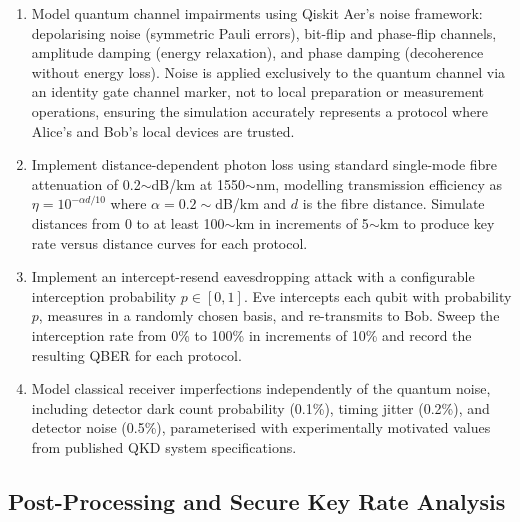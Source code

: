 \documentclass[10pt, a4paper]{report}
\begin{document}
\begin{enumerate}[label=\textbf{O3.\arabic*}, leftmargin=1.5cm]
    \item Model quantum channel impairments using Qiskit Aer's noise framework: depolarising noise (symmetric Pauli errors), bit-flip and phase-flip channels, amplitude damping (energy relaxation), and phase damping (decoherence without energy loss). Noise is applied exclusively to the quantum channel via an identity gate channel marker, not to local preparation or measurement operations, ensuring the simulation accurately represents a protocol where Alice's and Bob's local devices are trusted.

    \item Implement distance-dependent photon loss using standard single-mode fibre attenuation of 0.2$\sim$dB/km at 1550$\sim$nm, modelling transmission efficiency as $\eta = 10^{-\alpha d / 10}$ where $\alpha = 0.2\sim$dB/km and $d$ is the fibre distance. Simulate distances from 0 to at least 100$\sim$km in increments of 5$\sim$km to produce key rate versus distance curves for each protocol.

    \item Implement an intercept-resend eavesdropping attack with a configurable interception probability $p \in [0, 1]$. Eve intercepts each qubit with probability $p$, measures in a randomly chosen basis, and re-transmits to Bob. Sweep the interception rate from 0\% to 100\% in increments of 10\% and record the resulting QBER for each protocol.

    \item Model classical receiver imperfections independently of the quantum noise, including detector dark count probability (0.1\%), timing jitter (0.2\%), and detector noise (0.5\%), parameterised with experimentally motivated values from published QKD system specifications.
\end{enumerate}

\subsection{Post-Processing and Secure Key Rate Analysis}
\end{document}
